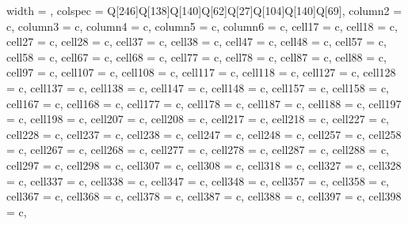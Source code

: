 \begin{longtblr}[
    theme = shortcaption,
    entry = {Inoculation tests on different grapevine varieties},
    caption = {\textbf{Summary of the inoculation tests on grapevine varieties
                ranked from most to less susceptible in the disease index.}
            Thirty-six local,
            regional and international varieties were screened in combination
            with eight
            rootstocks. The number of symptomatic leaves was counted 16 weeks
            after
            inoculation and infections were confirmed by qPCR. DI: disease
            index; AUDCP:
            area under the disease progress curve.},
    label = {tableS1},
    ]{
    width = \linewidth,
    colspec = {Q[246]Q[138]Q[140]Q[62]Q[27]Q[104]Q[140]Q[69]},
    column{2} = {c},
    column{3} = {c},
    column{4} = {c},
    column{5} = {c},
    column{6} = {c},
    cell{1}{7} = {c},
    cell{1}{8} = {c},
    cell{2}{7} = {c},
    cell{2}{8} = {c},
    cell{3}{7} = {c},
    cell{3}{8} = {c},
    cell{4}{7} = {c},
    cell{4}{8} = {c},
    cell{5}{7} = {c},
    cell{5}{8} = {c},
    cell{6}{7} = {c},
    cell{6}{8} = {c},
    cell{7}{7} = {c},
    cell{7}{8} = {c},
    cell{8}{7} = {c},
    cell{8}{8} = {c},
    cell{9}{7} = {c},
    cell{10}{7} = {c},
    cell{10}{8} = {c},
    cell{11}{7} = {c},
    cell{11}{8} = {c},
    cell{12}{7} = {c},
    cell{12}{8} = {c},
    cell{13}{7} = {c},
    cell{13}{8} = {c},
    cell{14}{7} = {c},
    cell{14}{8} = {c},
    cell{15}{7} = {c},
    cell{15}{8} = {c},
    cell{16}{7} = {c},
    cell{16}{8} = {c},
    cell{17}{7} = {c},
    cell{17}{8} = {c},
    cell{18}{7} = {c},
    cell{18}{8} = {c},
    cell{19}{7} = {c},
    cell{19}{8} = {c},
    cell{20}{7} = {c},
    cell{20}{8} = {c},
    cell{21}{7} = {c},
    cell{21}{8} = {c},
    cell{22}{7} = {c},
    cell{22}{8} = {c},
    cell{23}{7} = {c},
    cell{23}{8} = {c},
    cell{24}{7} = {c},
    cell{24}{8} = {c},
    cell{25}{7} = {c},
    cell{25}{8} = {c},
    cell{26}{7} = {c},
    cell{26}{8} = {c},
    cell{27}{7} = {c},
    cell{27}{8} = {c},
    cell{28}{7} = {c},
    cell{28}{8} = {c},
    cell{29}{7} = {c},
    cell{29}{8} = {c},
    cell{30}{7} = {c},
    cell{30}{8} = {c},
    cell{31}{8} = {c},
    cell{32}{7} = {c},
    cell{32}{8} = {c},
    cell{33}{7} = {c},
    cell{33}{8} = {c},
    cell{34}{7} = {c},
    cell{34}{8} = {c},
    cell{35}{7} = {c},
    cell{35}{8} = {c},
    cell{36}{7} = {c},
    cell{36}{8} = {c},
    cell{37}{8} = {c},
    cell{38}{7} = {c},
    cell{38}{8} = {c},
    cell{39}{7} = {c},
    cell{39}{8} = {c},
}
\end{longtblr}

